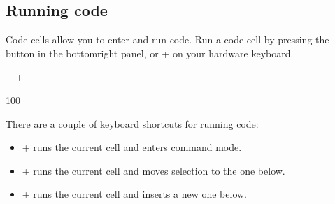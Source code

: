\documentclass[letterpaper,10pt,english]{sphinxmanual}
\newlength\nbsphinxcodecellspacing
\begin{document}
\subsection{Running code}
\label{\detokenize{notebooks/Intro/NotebookEditor:Running-code}}
Code cells allow you to enter and run code. Run a code cell by pressing the  button in the bottom\sphinxhyphen{}right panel, or + on your hardware keyboard.

{
\begin{sphinxVerbatim}[commandchars=\\\{\}]
\llap{\color{nbsphinxin}[1]:\,\hspace{\fboxrule}\hspace{\fboxsep}}  
\end{sphinxVerbatim}
}

{
\begin{sphinxVerbatim}[commandchars=\\\{\}]
\llap{\color{nbsphinxin}[5]:\,\hspace{\fboxrule}\hspace{\fboxsep}}
\end{sphinxVerbatim}
}

{

\kern-\sphinxverbatimsmallskipamount\kern-\baselineskip
\kern+\FrameHeightAdjust\kern-\fboxrule
\vspace{\nbsphinxcodecellspacing}

\begin{sphinxVerbatim}[commandchars=\\\{\}]
100
\end{sphinxVerbatim}
}

There are a couple of keyboard shortcuts for running code:
\begin{itemize}
\item {} 
+ runs the current cell and enters command mode.

\item {} 
+ runs the current cell and moves selection to the one below.

\item {} 
+ runs the current cell and inserts a new one below.

\end{itemize}
\end{document}
